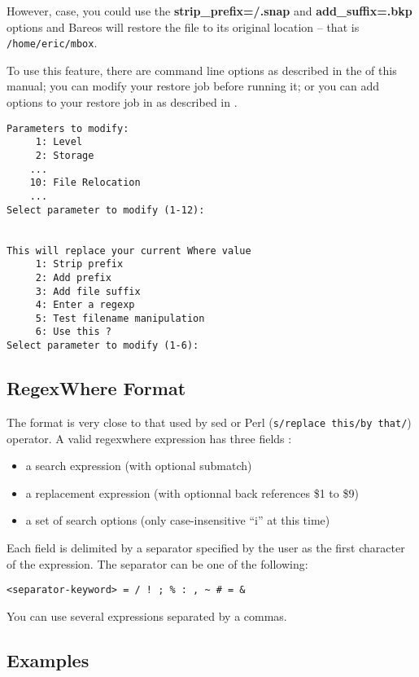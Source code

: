 However, case, you could use the
\textbf{strip\_prefix=/.snap} and \textbf{add\_suffix=.bkp} options and
Bareos will restore the file to its original location -- that is
\texttt{/home/eric/mbox}.

To use this feature, there are command line options as described in
the  of this manual;
you can modify your restore job before running it; or you can
add options to your restore job in as described in
.

\begin{verbatim}
Parameters to modify:
     1: Level
     2: Storage
    ...
    10: File Relocation
    ...
Select parameter to modify (1-12):


This will replace your current Where value
     1: Strip prefix
     2: Add prefix
     3: Add file suffix
     4: Enter a regexp
     5: Test filename manipulation
     6: Use this ?
Select parameter to modify (1-6):
\end{verbatim}


\subsection{RegexWhere Format}
    \label{useregexwhere}

The format is very close to that used by sed or Perl (\texttt{s/replace this/by
  that/}) operator. A valid regexwhere expression has three fields :
\begin{itemize}
\item a search expression (with optional submatch)
\item a replacement expression (with optionnal back references \$1 to \$9)
\item a set of search options (only case-insensitive ``i'' at this time)
\end{itemize}

Each field is delimited by a separator specified by the user as the first
character of the expression. The separator can be one of the following:
\begin{verbatim}
<separator-keyword> = / ! ; % : , ~ # = &
\end{verbatim}

You can use several expressions separated by a commas.

\subsection*{Examples}


